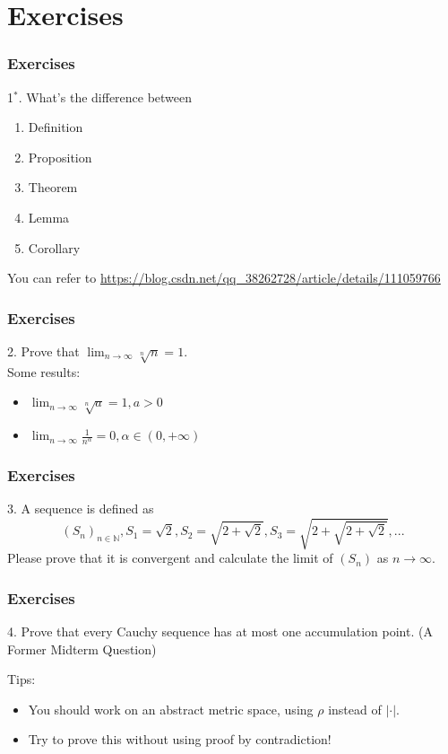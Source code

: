 \documentclass{beamer}
\begin{document}
\section{Exercises}
\begin{frame}
    \frametitle{Exercises}
    1$^*$. What's the difference between
    \begin{enumerate}
        \item Definition
        \item Proposition
        \item Theorem
        \item Lemma
        \item Corollary
    \end{enumerate}
    \vspace{2em}
    You can refer to 
    \url{https://blog.csdn.net/qq_38262728/article/details/111059766}
\end{frame}
\begin{frame}
    \frametitle{Exercises}
    2. Prove that $\lim_{n\rightarrow \infty} \sqrt[n]{n}=1$.\\ 
    \vspace{3em}
    Some results:
    \begin{itemize}
        \item $\lim_{n\rightarrow \infty} \sqrt[n]{a}=1,a>0$
        \item $\lim_{n\rightarrow \infty} \frac{1}{n^\alpha}=0,\alpha\in (0,+\infty)$
    \end{itemize}

\end{frame}
\begin{frame}
    \frametitle{Exercises}
    3. A sequence is defined as
    \begin{equation*}
        (S_n)_{n\in\mathbb{N}}, S_1=\sqrt{2}, S_2=\sqrt{2+\sqrt{2}}, S_3=\sqrt{2+\sqrt{2+\sqrt{2}}},...
    \end{equation*}
    Please prove that it is convergent and calculate the limit of $(S_n)$ as $n\rightarrow \infty$.
   
\end{frame}
\begin{frame}
    \frametitle{Exercises}
    4. Prove that every Cauchy sequence has at most one accumulation point.
    (A Former Midterm Question)
    
    \vspace{2em}
    Tips:
    \begin{itemize}
        \item You should work on an abstract metric space, using $\rho $ instead of $| \cdot |$.
        \item Try to prove this without using proof by contradiction!
    \end{itemize}
\end{frame}
\end{document}

